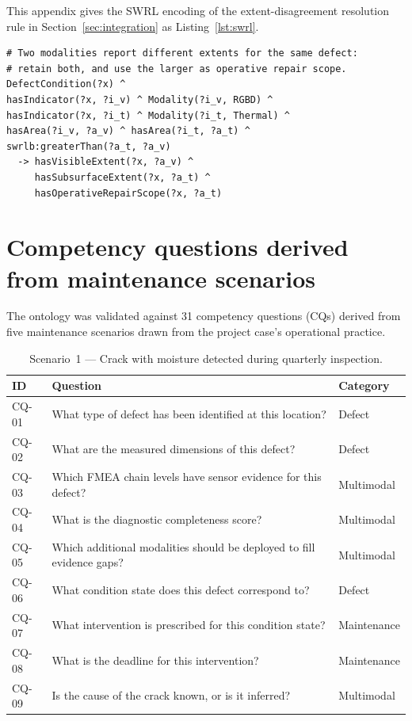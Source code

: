 \documentclass[11pt,a4paper]{article}
\begin{document}
This appendix gives the SWRL encoding of the extent-disagreement resolution rule in
Section~\ref{sec:integration} as Listing~\ref{lst:swrl}.

\begin{lstlisting}[caption={SWRL encoding of the extent-disagreement
  resolution rule.},label=lst:swrl,float=htbp]
# Two modalities report different extents for the same defect:
# retain both, and use the larger as operative repair scope.
DefectCondition(?x) ^
hasIndicator(?x, ?i_v) ^ Modality(?i_v, RGBD) ^
hasIndicator(?x, ?i_t) ^ Modality(?i_t, Thermal) ^
hasArea(?i_v, ?a_v) ^ hasArea(?i_t, ?a_t) ^
swrlb:greaterThan(?a_t, ?a_v)
  -> hasVisibleExtent(?x, ?a_v) ^
     hasSubsurfaceExtent(?x, ?a_t) ^
     hasOperativeRepairScope(?x, ?a_t)
\end{lstlisting}

\section{Competency questions derived from maintenance scenarios}
\label{app:cq}

The ontology was validated against 31 competency questions (CQs) derived
from five maintenance scenarios drawn from the project case's operational
practice. 

\begin{table}[htbp]
\centering
\caption{Scenario~1 --- Crack with moisture detected during quarterly
  inspection.}
\label{tab:cq-scenario1}
\begin{tabularx}{\linewidth}{@{}l X l@{}}
\toprule
\textbf{ID} & \textbf{Question} & \textbf{Category} \\
\midrule
CQ-01 & What type of defect has been identified at this location? & Defect \\
CQ-02 & What are the measured dimensions of this defect? & Defect \\
CQ-03 & Which FMEA chain levels have sensor evidence for this defect? &
  Multimodal \\
CQ-04 & What is the diagnostic completeness score? & Multimodal \\
CQ-05 & Which additional modalities should be deployed to fill evidence
  gaps? & Multimodal \\
CQ-06 & What condition state does this defect correspond to? & Defect \\
CQ-07 & What intervention is prescribed for this condition state? &
  Maintenance \\
CQ-08 & What is the deadline for this intervention? & Maintenance \\
CQ-09 & Is the cause of the crack known, or is it inferred? &
  Multimodal \\
\bottomrule
\end{tabularx}
\end{table}
\end{document}
